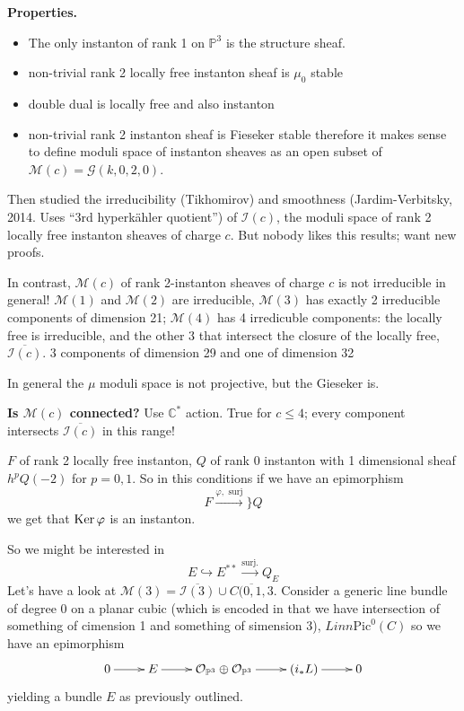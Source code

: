 \noindent
{\bf Properties.}
\begin{itemize}
\item The only instanton of rank 1 on
$\mathbb{P}^3$ is
the structure sheaf.
\item non-trivial rank 2 locally free
instanton sheaf is  $\mu_0$ stable
\item double dual is locally free and
also instanton
\item non-trivial rank 2 instanton sheaf
is Fieseker stable
therefore it makes sense to define
moduli space of instanton sheaves as
an open subset of
$\mathcal{M}(c)=\mathcal{G}(k,0,2,0)$.
\end{itemize}

Then studied the irreducibility (Tikhomirov)
and smoothness (Jardim-Verbitsky, 2014. Uses
``3rd hyperkähler quotient'') of
$\mathcal{I}(c)$, the moduli space of rank 2
locally free instanton sheaves of charge $c.$
But nobody likes this results; want new
proofs.

In contrast, $\mathcal{M}(c)$ of rank
2-instanton sheaves of charge $c$ is not
irreducible in general! $\mathcal{M}(1)$ and
$\mathcal{M}(2)$ are irreducible,
$\mathcal{M}(3)$ has exactly 2 irreducible
components of dimension 21; $\mathcal{M}(4)$
has 4 irredicuble components: the locally
free is irreducible, and the other 3 that
intersect the closure of the locally free,
$\overline{\mathcal{I}(c)}$. 3 components of
dimension 29 and one of dimension 32

\begin{remark}
\label{remark-gieseker}
In general the $\mu$ moduli space is
not projective, but the Gieseker is.
\end{remark}

\noindent
{\bf Is $\mathcal{M}(c)$ connected?} Use
$\mathbb{C}^*$ action. True for $c \leq 4$;
every component intersects
$\overline{\mathcal{I}(c)}$ in this range!

\begin{definition}
\label{definition-elementary-transformation}
$F$ of rank 2 locally free instanton,
$Q$ of rank 0 instanton with 1 dimensional
sheaf $h^p Q(-2)$ for $p = 0,1$.
So in this conditions if we have an
epimorphism
 $$
F \overset{\varphi,\text{ surj}}{\to}\} Q
$$
we get that $\mathop{\mathrm{Ker}} \varphi$ is an instanton.
\end{definition}

So  we might be interested in
$$
E \hookrightarrow E^{*
*}\xrightarrow{\text{surj.}} Q_E
$$
Let's have a look at
$\mathcal{M}(3)=\overline{\mathcal{I}(3)}\cup
\overline{C(0,1,3}$. Consider a generic line
bundle of degree 0 on a planar cubic (which
is encoded in that we have intersection of
something of cimension 1 and something of
simension 3), $L inn \text{Pic}^0(C)$ so we
have an epimorphism
$$
\xymatrix{
0\ar[r]&E\ar[r]&\mathcal{O}_{\mathbb{P}^3}
\oplus
\mathcal{O}_{\mathbb{P}^3}\ar[r]&(i_*
L)\ar[r]&0
}
$$
yielding a bundle $E$ as previously outlined.

